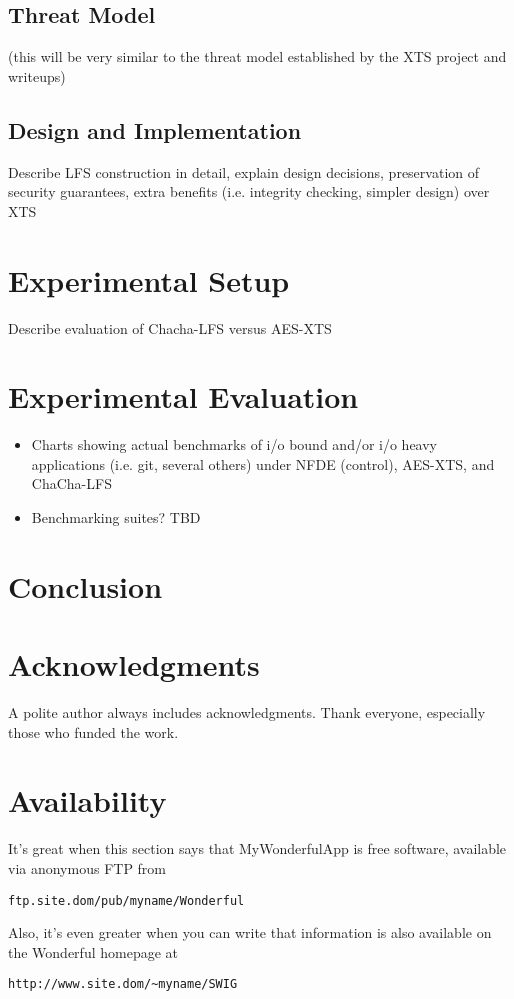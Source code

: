\documentclass[letterpaper,twocolumn,10pt]{article}
\begin{document}
\subsection{Threat Model}
(this will be very similar to the threat model established by the XTS project and writeups)

\subsection{Design and Implementation}
Describe LFS construction in detail, explain design decisions, preservation of security guarantees, extra benefits
(i.e. integrity checking, simpler design) over XTS

\section{Experimental Setup}
Describe evaluation of Chacha-LFS versus AES-XTS

\section{Experimental Evaluation}
\begin{itemize}
  \item Charts showing actual benchmarks of i/o bound and/or i/o heavy applications (i.e. git, several others) under
  NFDE (control), AES-XTS, and ChaCha-LFS
  \item Benchmarking suites? TBD
\end{itemize}

\section{Conclusion}


\section{Acknowledgments}

A polite author always includes acknowledgments. Thank everyone, especially those who funded the work. 

\section{Availability}

It's great when this section says that MyWonderfulApp is free software, available via anonymous FTP from

\begin{center}
{\tt ftp.site.dom/pub/myname/Wonderful}\\
\end{center}

Also, it's even greater when you can write that information is also available on the Wonderful homepage at 

\begin{center}
{\tt http://www.site.dom/\~{}myname/SWIG}
\end{center}

{\footnotesize  }

\end{document}
